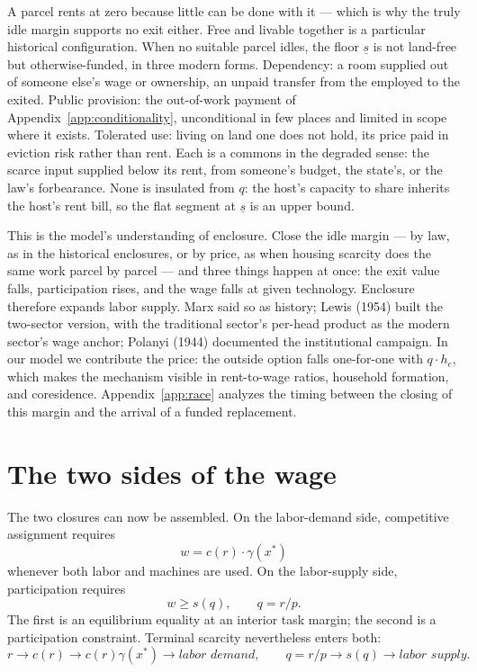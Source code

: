 \documentclass[12pt]{article}
\theoremstyle{plain}
\begin{document}
A parcel rents at zero because little can be done with it --- which is why the truly idle margin supports no exit either. Free and livable together is a particular historical configuration. When no suitable parcel idles, the floor $\underline{s}$ is not land-free but otherwise-funded, in three modern forms. Dependency: a room supplied out of someone else's wage or ownership, an unpaid transfer from the employed to the exited. Public provision: the out-of-work payment of Appendix~\ref{app:conditionality}, unconditional in few places and limited in scope where it exists. Tolerated use: living on land one does not hold, its price paid in eviction risk rather than rent. Each is a commons in the degraded sense: the scarce input supplied below its rent, from someone's budget, the state's, or the law's forbearance. None is insulated from $q$: the host's capacity to share inherits the host's rent bill, so the flat segment at $\underline{s}$ is an upper bound.

This is the model's understanding of enclosure. Close the idle margin --- by law, as in the historical enclosures, or by price, as when housing scarcity does the same work parcel by parcel --- and three things happen at once: the exit value falls, participation rises, and the wage falls at given technology. Enclosure therefore expands labor supply. Marx said so as history; Lewis (1954) built the two-sector version, with the traditional sector's per-head product as the modern sector's wage anchor; Polanyi (1944) documented the institutional campaign. In our model we contribute the price: the outside option falls one-for-one with $q\cdot h_e$, which makes the mechanism visible in rent-to-wage ratios, household formation, and coresidence. Appendix~\ref{app:race} analyzes the timing between the closing of this margin and the arrival of a funded replacement.

\section{The two sides of the wage}\label{sec:interval}

The two closures can now be assembled. On the labor-demand side, competitive
assignment requires
\[
w = c(r)\cdot\gamma(x^*)
\]
whenever both labor and machines are used. On the labor-supply side,
participation requires
\[
w \ge s(q), \qquad q=r/p.
\]
The first is an equilibrium equality at
an interior task margin; the second is a participation constraint. Terminal
scarcity nevertheless enters both:
\[
r
\to c(r)
\to c(r)\gamma(x^*)
\to \textit{labor demand},
\qquad
q=r/p
\to s(q)
\to \textit{labor supply}.
\]
\end{document}
